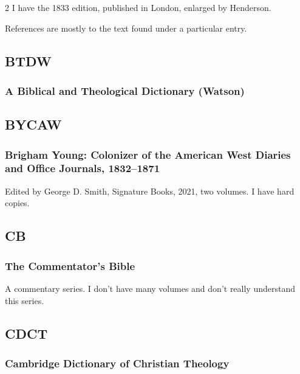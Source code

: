 \begin{multicols}{2}
			I have the 1833 edition, published in London, enlarged by Henderson.
			
			References are mostly to the text found under a particular entry.
			
	\subsection*{BTDW}
	
		\subsubsection*{A Biblical and Theological Dictionary (Watson)}
		
			\phantom{.}
			
	\subsection*{BYCAW}
	
		\subsubsection{Brigham Young: Colonizer of the American West Diaries and Office Journals, 1832--1871}
		
			Edited by George D. Smith, Signature Books, 2021, two volumes. I have hard copies.
			
	\subsection*{CB}
	
		\subsubsection*{The Commentator's Bible}
		
			A commentary series. I don't have many volumes and don't really understand this series.
			
	\subsection*{CDCT}
	
		\subsubsection*{Cambridge Dictionary of Christian Theology}
		

\end{multicols}
